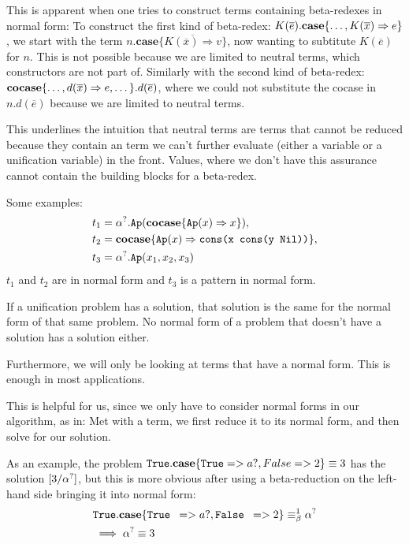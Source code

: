 \documentclass[twoside,12pt,a4paper]{article}
\begin{document}
This is apparent when one tries to construct terms containing beta-redexes in normal form: 
To construct the first kind of beta-redex: $K(\overline{e}).\textbf{case}\{\dots,K(\overline{x})\Rightarrow e\}$,
we start with the term $n.\textbf{case}\{\overline{K(\overline{x})\Rightarrow v}\}$, now wanting to subtitute $K(\overline{e})$ for $n$. 
This is not possible because we are limited to neutral terms, which constructors are not part of.
Similarly with the second kind of beta-redex:
$\textbf{cocase}\{\dots,d(\overline{x}) \Rightarrow e, \dots\}.d(\overline{e})$, where we could not substitute the cocase in $n.d(\overline{e})$ because we are limited to neutral terms.
        
This underlines the intuition that neutral terms are terms that cannot be reduced because
they contain an term we can't further evaluate (either a variable or a unification variable) in the front.
Values, where we don't have this assurance cannot contain the building blocks for a beta-redex.

Some examples: 
\begin{align*}
    \begin{split}
        t_1 &= \alpha^?.\texttt{Ap}(\textbf{cocase}\{\texttt{Ap}(x)\Rightarrow x\}), \\
        t_2 &= \textbf{cocase}\{\texttt{Ap}(x)\Rightarrow \texttt{cons(x cons(y Nil))}\},   \\
        t_3 &= \alpha^?.\texttt{Ap}(x_1, x_2, x_3)
    \end{split}    
\end{align*}
$t_1$ and $t_2$ are in normal form and $t_3$ is a pattern in normal form.

\begin{theorem}
    If a unification problem has a solution, that solution is the same for the normal form of that same problem. 
    No normal form of a problem that doesn't have a solution has a solution either.
\end{theorem}

Furthermore, we will only be looking at terms that have a normal form. This is enough in most applications. %

This is helpful for us, since we only have to consider normal forms in our algorithm, as in: 
Met with a term, we first reduce it to its normal form, and then solve for our solution.

As an example, the problem $\texttt{True}.\textbf{case} \{ \texttt{True} => a?, False => 2 \} \equiv 3 $ has the solution $[3/\alpha^?]$, 
but this is more obvious after using a beta-reduction on the left-hand side bringing it into normal form:
\begin{align*}
    &\texttt{True}.\textbf{case} \{ \texttt{True } => a?, \texttt{False } => 2 \} \equiv_{\beta}^1 \alpha^?  \\
    &\implies \alpha^? \equiv 3   
\end{align*}
\end{document}
